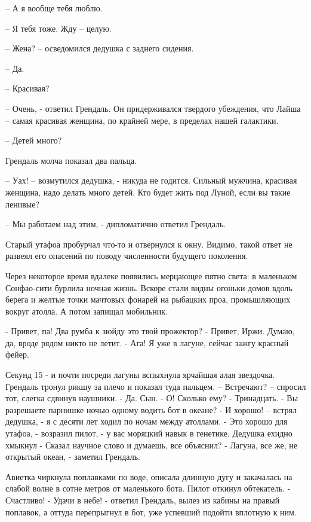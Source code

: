 \documentclass[10pt,final]{book}
\begin{document}
-- А я вообще тебя люблю.

-- Я тебя тоже. Жду -- целую.

-- Жена? -- осведомился дедушка с заднего сидения.

-- Да.

-- Красивая?

-- Очень, - ответил Грендаль. Он придерживался твердого убеждения, что Лайша -- самая красивая женщина, по крайней мере, в пределах нашей галактики.

-- Детей много?

Грендаль молча показал два пальца.

-- Уах! -- возмутился дедушка, - никуда не годится. Сильный мужчина, красивая женщина, надо делать много детей. Кто будет жить под Луной, если вы такие ленивые?

-- Мы работаем над этим, - дипломатично ответил Грендаль.

Старый утафоа пробурчал что-то и отвернулся к окну. Видимо, такой ответ не развеял его опасений по поводу численности будущего поколения.

Через некоторое время вдалеке появились мерцающее пятно света: в маленьком Сонфао-сити бурлила ночная жизнь. Вскоре стали видны огоньки домов вдоль берега и желтые точки мачтовых фонарей на рыбацких проа, промышляющих вокруг атолла. А потом запищал мобильник.

- Привет, па! Два румба к зюйду это твой прожектор?
- Привет, Иржи. Думаю, да, вроде рядом никто не летит.
- Ага! Я уже в лагуне, сейчас зажгу красный фейер.

Секунд 15 - и почти посреди лагуны вспыхнула ярчайшая алая звездочка. Грендаль тронул рикшу за плечо и показал туда пальцем.
-- Встречают? -- спросил тот, слегка сдвинув наушники.
- Да. Сын.
- О! Сколько ему?
- Тринадцать.
- Вы разрешаете парнишке ночью одному водить бот в океане?
- И хорошо! -- встрял дедушка, - я с десяти лет ходил по ночам между атоллами.
- Это хорошо для утафоа, - возразил пилот, - у вас моряцкий навык в генетике.
Дедушка ехидно хмыкнул
- Сказал научное слово и думаешь, все объяснил?
- Лагуна, все же, не открытый океан, - заметил Грендаль.

Авиетка чиркнула поплавками по воде, описала длинную дугу и закачалась на слабой волне в сотне метров от маленького бота. Пилот откинул обтекатель.
- Счастливо!
- Удачи в небе! - ответил Грендаль, вылез из кабины на правый поплавок, а оттуда перепрыгнул в бот, уже успевший подойти вплотную к ним.
\end{document}
